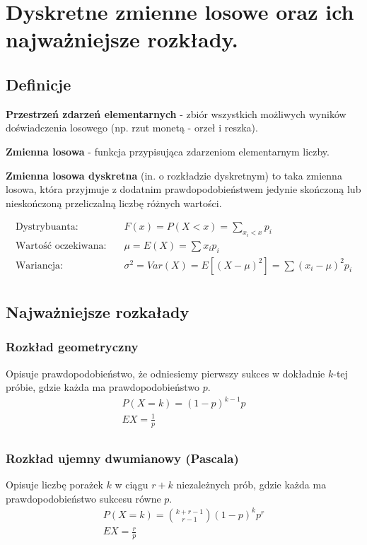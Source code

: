 \section{Dyskretne zmienne losowe oraz ich najważniejsze rozkłady.}

\subsection{Definicje}

\textbf{Przestrzeń zdarzeń elementarnych} - zbiór wszystkich możliwych wyników doświadczenia losowego (np. rzut monetą - orzeł i reszka).

\textbf{Zmienna losowa} - funkcja przypisująca zdarzeniom elementarnym liczby.

\textbf{Zmienna losowa dyskretna} (in. o rozkładzie dyskretnym) to taka zmienna losowa,
która przyjmuje z dodatnim prawdopodobieństwem jedynie skończoną lub nieskończoną przeliczalną liczbę różnych wartości.

\begin{align*}
    \text{Dystrybuanta:} \quad & F(x)=P(X < x)=\sum_{x_i<x}p_i\\
    \text{Wartość oczekiwana:} \quad & \mu = E(X)=\sum x_i p_i\\
    \text{Wariancja:} \quad & \sigma^2 = Var(X)=E\left[ (X - \mu)^2 \right] = \sum (x_i - \mu)^2p_i\\
\end{align*}

\subsection{Najważniejsze rozkałady}

\subsubsection{Rozkład geometryczny}
Opisuje prawdopodobieństwo, że odniesiemy pierwszy sukces w dokładnie $k$-tej próbie,
gdzie każda ma prawdopodobieństwo $p$.
\begin{gather*}
    P(X=k)=(1-p)^{k-1}p\\
    EX=\frac{1}{p}\\
\end{gather*}

\subsubsection{Rozkład ujemny dwumianowy (Pascala)}
Opisuje liczbę porażek $k$ w ciągu $r+k$ niezależnych prób, gdzie każda ma prawdopodobieństwo sukcesu równe $p$.
\begin{gather*}
    P(X=k)=\binom{k+r-1}{r-1}(1-p)^kp^r\\
    EX=\frac{r}{p}\\
\end{gather*}

